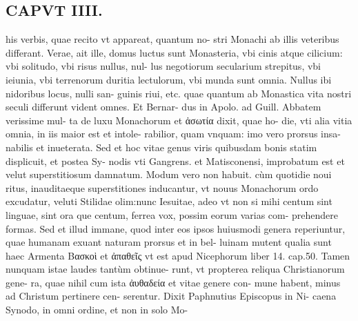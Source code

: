 \documentclass{article}
\begin{document}
\begin{pages}
\section*{CAPVT  IIII. }
\marginpar{[ p.217 ]}\pstart his verbis, quae recito vt appareat, quantum no- stri Monachi ab illis veteribus differant. Verae, ait ille, domus luctus sunt Monasteria, vbi cinis atque cilicium: vbi solitudo, vbi risus nullus, nul- lus negotiorum secularium strepitus, vbi ieiunia, vbi terrenorum duritia lectulorum, vbi munda sunt omnia. Nullus ibi nidoribus locus, nulli san- guinis riui, etc. quae quantum ab Monastica vita nostri seculi differunt vident omnes. Et Bernar- dus in Apolo. ad Guill. Abbatem verissime mul- ta de luxu Monachorum et ἀσωτία dixit, quae ho- die, vti alia vitia omnia, in iis maior est et intole- rabilior, quam vnquam: imo vero prorsus insa- nabilis et inueterata. Sed et hoc vitae genus viris quibusdam bonis statim displicuit, et postea Sy- nodis vti Gangrens. et Matisconensi, improbatum est et velut superstitiosum damnatum. Modum vero non habuit. cùm quotidie noui ritus, inauditaeque  superstitiones inducantur, vt nouus Monachorum ordo excudatur, veluti Stilidae olim:nunc Iesuitae, adeo vt non si mihi centum sint linguae, sint ora que centum, ferrea vox, possim eorum varias com- prehendere formas. Sed et illud immane, quod inter eos ipsos huiusmodi genera reperiuntur, quae humanam exuant naturam prorsus et in bel- luinam mutent qualia sunt haec Armenta Bασκοὶ et ἀπαθεῖς vt est apud Nicephorum liber  14. cap.50. Tamen nunquam istae laudes tantùm obtinue- runt, vt propterea reliqua Christianorum gene- ra, quae nihil cum ista ἀυθαδεία et vitae genere con- mune habent, minus ad Christum pertinere cen- serentur. Dixit Paphnutius Episcopus in Ni- caena Synodo, in omni ordine, et non in solo Mo-  \pend

\end{pages}
\end{document}
